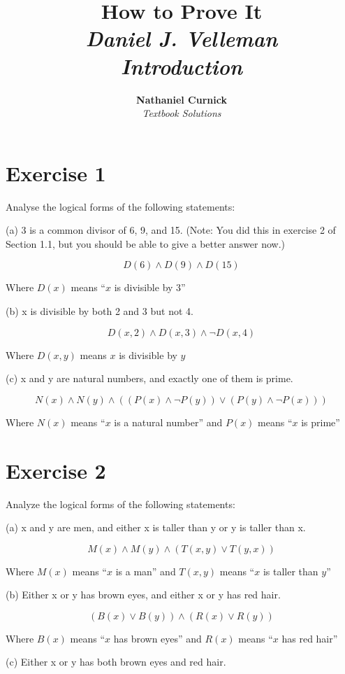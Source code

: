 \documentclass[11pt]{article}
\title{\textbf{How to Prove It} \\ {\Large\itshape Daniel J. Velleman} \\ {\Large\itshape Introduction}}
\author{\textbf{Nathaniel Curnick} \\ \textit{Textbook Solutions}}
\date{}
\begin{document}
\maketitle

\section*{Exercise 1}

Analyse the logical forms of the following statements:

\noindent (a) 3 is a common divisor of 6, 9, and 15. (Note: You did this in exercise 2 of Section 1.1, but you should be able to give a better answer now.)

$$D(6) \wedge D(9) \wedge D(15)$$

Where $D(x)$ means ``$x$ is divisible by 3''

\noindent (b) x is divisible by both 2 and 3 but not 4.

$$D(x, 2) \wedge D(x, 3) \wedge \neg D(x, 4)$$

Where $D(x,y)$ means $x$ is divisible by $y$

\noindent (c) x and y are natural numbers, and exactly one of them is prime.

$$N(x) \wedge N(y) \wedge ((P(x) \wedge \neg P(y)) \vee (P(y) \wedge \neg P(x)))$$

Where $N(x)$ means ``$x$ is a natural number'' and $P(x)$ means ``$x$ is prime''

\section*{Exercise 2}

Analyze the logical forms of the following statements:

\noindent  (a) x and y are men, and either x is taller than y or y is taller than x.

$$M(x) \wedge M(y) \wedge (T(x,y) \vee T(y,x))$$

Where $M(x)$ means ``$x$ is a man'' and $T(x,y)$ means ``$x$ is taller than $y$''

\noindent (b) Either x or y has brown eyes, and either x or y has red hair.

$$(B(x) \vee B(y)) \wedge (R(x) \vee R(y))$$

Where $B(x)$ means ``$x$ has brown eyes'' and $R(x)$ means ``$x$ has red hair''

\noindent (c) Either x or y has both brown eyes and red hair.
\end{document}
